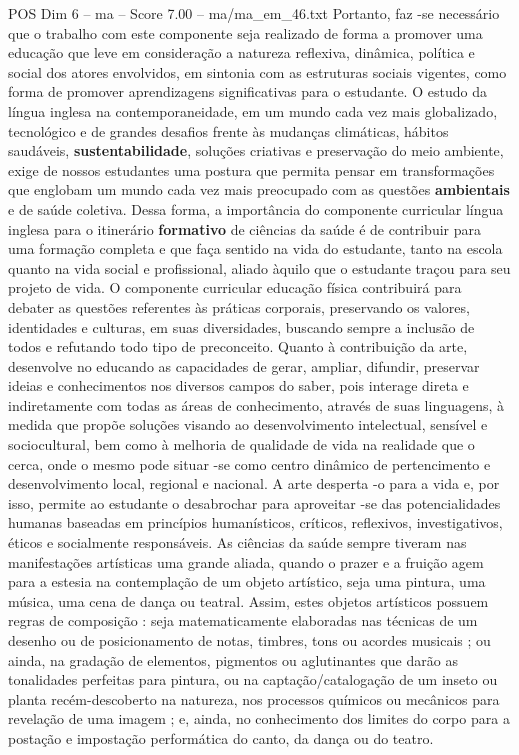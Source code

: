 \begin{textsample}{POS Dim 6 – ma – Score 7.00 – ma/ma\_em\_46.txt}
Portanto, faz -se necessário que o trabalho com este componente seja realizado de forma a promover uma educação que leve em consideração a natureza reflexiva, dinâmica, política e social dos atores envolvidos, em sintonia com as estruturas sociais vigentes, como forma de promover aprendizagens significativas para o estudante.
O estudo da língua inglesa na contemporaneidade, em um mundo cada vez mais globalizado, tecnológico e de grandes desafios frente às mudanças climáticas, hábitos saudáveis, \textbf{sustentabilidade}, soluções criativas e preservação do meio ambiente, exige de nossos estudantes uma postura que permita pensar em transformações que englobam um mundo cada vez mais preocupado com as questões \textbf{ambientais} e de saúde coletiva.
Dessa forma, a importância do componente curricular língua inglesa para o itinerário \textbf{formativo} de ciências da saúde é de contribuir para uma formação completa e que faça sentido na vida do estudante, tanto na escola quanto na vida social e profissional, aliado àquilo que o estudante traçou para seu projeto de vida.
O componente curricular educação física contribuirá para debater as questões referentes às práticas corporais, preservando os valores, identidades e culturas, em suas diversidades, buscando sempre a inclusão de todos e refutando todo tipo de preconceito.
Quanto à contribuição da arte, desenvolve no educando as capacidades de gerar, ampliar, difundir, preservar ideias e conhecimentos nos diversos campos do saber, pois interage direta e indiretamente com todas as áreas de conhecimento, através de suas linguagens, à medida que propõe soluções visando ao desenvolvimento intelectual, sensível e sociocultural, bem como à melhoria de qualidade de vida na realidade que o cerca, onde o mesmo pode situar -se como centro dinâmico de pertencimento e desenvolvimento local, regional e nacional.
A arte desperta -o para a vida e, por isso, permite ao estudante o desabrochar para aproveitar -se das potencialidades humanas baseadas em princípios humanísticos, críticos, reflexivos, investigativos, éticos e socialmente responsáveis.
As ciências da saúde sempre tiveram nas manifestações artísticas uma grande aliada, quando o prazer e a fruição agem para a estesia na contemplação de um objeto artístico, seja uma pintura, uma música, uma cena de dança ou teatral.
Assim, estes objetos artísticos possuem regras de composição : seja matematicamente elaboradas nas técnicas de um desenho ou de posicionamento de notas, timbres, tons ou acordes musicais ; ou ainda, na gradação de elementos, pigmentos ou aglutinantes que darão as tonalidades perfeitas para pintura, ou na captação/catalogação de um inseto ou planta recém-descoberto na natureza, nos processos químicos ou mecânicos para revelação de uma imagem ; e, ainda, no conhecimento dos limites do corpo para a postação e impostação performática do canto, da dança ou do teatro.

\end{textsample}
